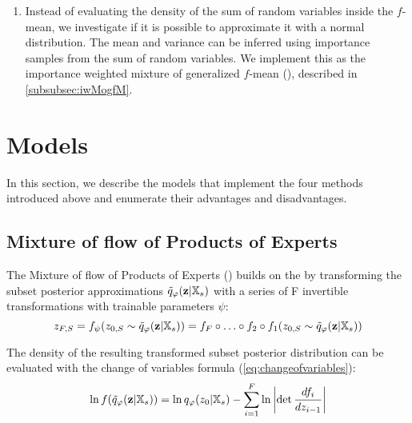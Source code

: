 \begin{enumerate}
    \item Instead of evaluating the density of the sum of random variables inside the $f$-mean, we investigate if it is possible to approximate it with a normal distribution.
    The mean and variance can be inferred using importance samples from the sum of random variables.
    We implement this as the importance weighted mixture of generalized $f$-mean (), described in \cref{subsubsec:iwMogfM}.

\end{enumerate}


\section{Models}
In this section, we describe the models that implement the four methods introduced above and enumerate their advantages and disadvantages.


\subsection{Mixture of flow of Products of Experts}\label{subsec:mofopoe}
The Mixture of flow of Products of Experts () builds on the  by transforming the subset posterior approximations $\tilde{q}_{\varphi}(\textbf{z}|\mathbb{X}_s)$ with a series of F invertible transformations with trainable parameters $\psi$:
\begin{equation}
    z_{F,S} =f_{\psi}(z_{0,S} \sim \tilde{q}_{\varphi}(\textbf{z}|\mathbb{X}_s)) = f_F \circ \ldots \circ f_2 \circ f_1(z_{0,S} \sim \tilde{q}_{\varphi}(\textbf{z}|\mathbb{X}_s))
\end{equation}

The density of the resulting transformed subset posterior distribution can be evaluated with the change of variables formula (\cref{eq:changeofvariables}):
\begin{equation}
    \label{eq:changeofvariables_}
    \ln f(\tilde{q}_{\varphi}(\textbf{z}|\mathbb{X}_s)) = \ln q_{\varphi} (z_0|\mathbb{X}_s) - \sum _{i=1} ^{F}\ln \left|  \det \frac{df_i}{dz_{i-1}}\right|
\end{equation}

